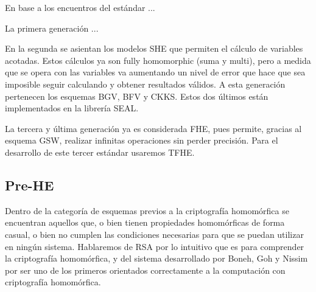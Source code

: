 En base a los encuentros del estándar ...

La primera generación ...

En la segunda se asientan los modelos SHE que permiten el cálculo de variables acotadas. Estos cálculos ya son fully homomorphic (suma y multi), pero a medida que se opera con las variables va aumentando un nivel de error que hace que sea imposible seguir calculando y obtener resultados válidos. A esta generación pertenecen los esquemas BGV, BFV y CKKS. Estos dos últimos están implementados en la librería SEAL.

La tercera y última generación ya es considerada FHE, pues permite, gracias al esquema GSW, realizar infinitas operaciones sin perder precisión. Para el desarrollo de este tercer estándar usaremos TFHE.

\subsection{Pre-HE}

Dentro de la categoría de esquemas previos a la criptografía homomórfica se encuentran aquellos que, o bien tienen propiedades homomórficas de forma casual, o bien no cumplen las condiciones necesarias para que se puedan utilizar en ningún sistema. Hablaremos de RSA por lo intuitivo que es para comprender la criptografía homomórfica, y del sistema desarrollado por Boneh, Goh y Nissim por ser uno de los primeros orientados correctamente a la computación con criptografía homomórfica.

